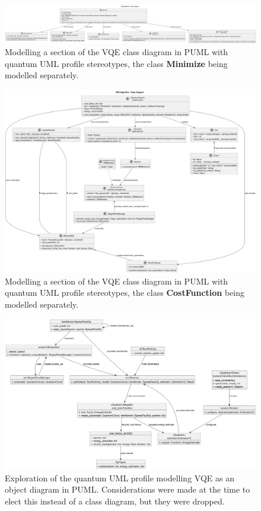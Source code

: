 \documentclass{article}
\begin{document}
\begin{figure}[H]
    \centering
    \includegraphics[width=1\linewidth]{vqe_uml_profile_cd_v2-VQE_Algorithm___Class_Diagram.png}
    \caption{Modelling a section of the VQE class diagram in PUML with quantum UML profile stereotypes, the class \textbf{Minimize} being modelled separately.}
    \label{fig:vqe_uml_profile_cd_v2-VQE_Algorithm___Class_Diagram}
\end{figure}

\begin{figure}[H]
    \centering
    \includegraphics[width=1\linewidth]{vqe_uml_profile_cd_v3-VQE_Algorithm___Class_Diagram.png}
    \caption{Modelling a section of the VQE class diagram in PUML with quantum UML profile stereotypes, the class \textbf{CostFunction} being modelled separately.}
    \label{fig:vqe_uml_profile_cd_v3-VQE_Algorithm___Class_Diagram}
\end{figure}

\begin{figure}[H]
    \centering
    \includegraphics[width=1\linewidth]{vqe_uml_profile_od_v1.png}
    \caption{Exploration of the quantum UML profile modelling VQE as an object diagram in PUML. Considerations were made at the time to elect this instead of a class diagram, but they were dropped.}
    \label{fig:vqe_uml_profile_od_v1}
\end{figure}
\end{document}
